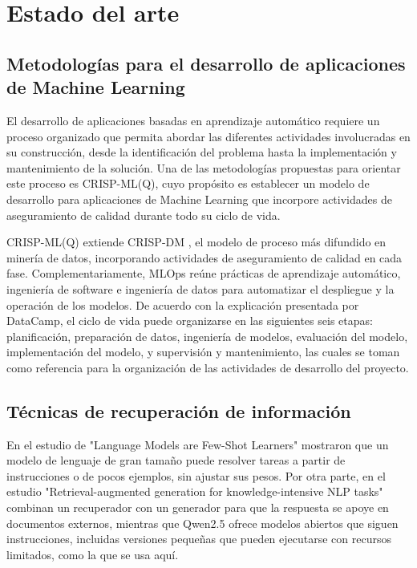 ﻿\section{Estado del arte}

\subsection{Metodologías para el desarrollo de aplicaciones de Machine Learning}
El desarrollo de aplicaciones basadas en aprendizaje automático requiere un proceso organizado que permita abordar las diferentes actividades involucradas en su construcción, desde la identificación del problema hasta la implementación y mantenimiento de la solución. Una de las metodologías propuestas para orientar este proceso es CRISP-ML(Q), cuyo propósito es establecer un modelo de desarrollo para aplicaciones de Machine Learning que incorpore actividades de aseguramiento de calidad durante todo su ciclo de vida.

CRISP-ML(Q) \cite{studer2021crispml} extiende CRISP-DM \cite{wirth2000crispdm}, el modelo de proceso más difundido en minería de datos, incorporando actividades de aseguramiento de calidad en cada fase. Complementariamente, MLOps \cite{kreuzberger2023mlops} reúne prácticas de aprendizaje automático, ingeniería de software e ingeniería de datos para automatizar el despliegue y la operación de los modelos. De acuerdo con la explicación presentada por DataCamp\cite{datacamp_ml_lifecycle}, el ciclo de vida puede organizarse en las siguientes seis etapas: planificación, preparación de datos, ingeniería de modelos, evaluación del modelo, implementación del modelo, y supervisión y mantenimiento, las cuales se toman como referencia para la organización de las actividades de desarrollo del proyecto.

\subsection{Técnicas de recuperación de información}

En el estudio de "Language Models are Few-Shot Learners" \cite{brown2020} mostraron que un modelo de lenguaje de gran tamaño puede resolver tareas a partir de instrucciones o de pocos ejemplos, sin ajustar sus pesos. Por otra parte, en el estudio "Retrieval-augmented generation for knowledge-intensive NLP tasks" \cite{lewis2020} combinan un recuperador con un generador para que la respuesta se apoye en documentos externos, mientras que Qwen2.5 \cite{qwen2024} ofrece modelos abiertos que siguen instrucciones, incluidas versiones pequeñas que pueden ejecutarse con recursos limitados, como la que se usa aquí.

